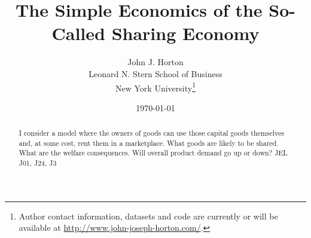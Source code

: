 \documentclass[11pt]{article}
\begin{document}
 

\newtheorem{prop}{Proposition}


\title{The Simple Economics of the So-Called Sharing Economy} 

\date{\today}

\author{John J. Horton \\ Leonard N. Stern School of Business \\ New York University\footnote{ Author contact information, datasets and code are currently or will be available at \href{http://www.john-joseph-horton.com/}{http://www.john-joseph-horton.com/}. } }
\maketitle

\begin{abstract}
\noindent  I consider a model where the owners of goods can use those capital goods themselves and, at some cost, rent them in a marketplace. 
What goods are likely to be shared. 
What are the welfare consequences. 
Will overall product demand go up or down? \newline
\noindent JEL J01, J24, J3
\end{abstract} 


\end{document}
